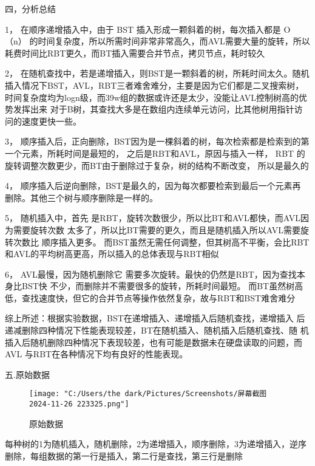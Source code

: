 \documentclass[]{article}
\begin{document}
\begin{large}
	\heiti
	四，分析总结
\end{large}

1， 在顺序递增插入中，由于 BST 插入形成一颗斜着的树，每次插入都是 O（n）
的时间复杂度，所以所需时间非常非常高久，而AVL需要大量的旋转，所以
耗费时间比RBT更久，而BT插入需要合并节点，拷贝节点，耗时较久

2， 在随机查找中，若是递增插入，则BST是一颗斜着的树，所耗时间太久。随机插入情况下BST，AVL，RBT三者难舍难分，主要是因为它们都是二叉搜索树，时间复杂度均为logn级，而39w组的数据或许还是太少，没能让AVL控制树高的优势发挥出来
对于B树，其查找大多是在数组内连续单元访问，比其他树用指针访问的速度更快一些。 

3， 顺序插入后，正向删除，BST因为是一棵斜着的树，每次检索都是检索到的第一个元素，所耗时间是最短的，
之后是RBT和AVL，原因与插入一样，
RBT 的旋转调整次数更少，而BT由于删除过于复杂，树的结构不断改变，
所以是最久的 

4， 顺序插入后逆向删除，BST是最久的，因为每次都要检索到最后一个元素再
删除。其他三个树与顺序删除是一样的。 

5， 随机插入中，首先
是RBT，旋转次数很少，所以比BT和AVL都快，而AVL因为需要旋转次数
太多了，所以比BT需要的更久，而且是随机插入所以AVL需要旋转次数比
顺序插入更多。 而BST虽然无需任何调整，但其树高不平衡，会比RBT和AVL的平均树高更高，所以插入的总体表现与RBT相似


6， AVL最慢，因为随机删除它
需要多次旋转。最快的仍然是RBT，因为查找本身比BST快
不少，而删除并不需要很多的旋转，所耗时间最短。 而BT虽然树高低，查找速度快，但它的合并节点等操作依然复杂，故与RBT和BST难舍难分

综上所述：根据实验数据，BST在递增插入、递增插入后随机查找，递增插入
后递减删除四种情况下性能表现较差，BT在随机插入、随机插入后随机查找、随
机插入后随机删除四种情况下表现较差，也有可能是数据未在硬盘读取的问题，而
AVL 与RBT在各种情况下均有良好的性能表现。

\begin{large}
	\heiti
	五.原始数据
\end{large}
\begin{figure}[h]
	\centering
	\texttt{[image: "C:/Users/the dark/Pictures/Screenshots/屏幕截图 2024-11-26 223325.png"]}
	\caption{原始数据}
	\label{fig:enter-label}
\end{figure}

每种树的1为随机插入，随机删除，2为递增插入，顺序删除，3为递增插入，逆序删除，每组数据的第一行是插入，第二行是查找，第三行是删除
\end{document}
